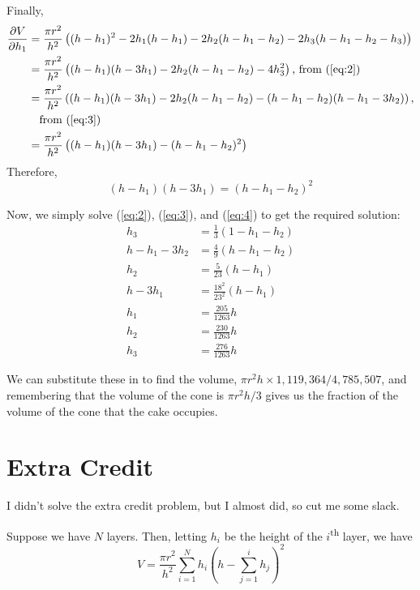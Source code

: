 \documentclass[12pt]{article}
\newcommand{\ts}[1]{\textsuperscript{#1}}
\begin{document}
Finally,
\begin{align*}
  \frac{\partial V}{\partial h_1} &= \frac{\pi r^2}{h^2}\left( (h - h_1)^2 - 2h_1(h-h_1) - 2h_2(h - h_1 - h_2) - 2h_3(h - h_1 - h_2 - h_3) \right)\\
                                  &= \frac{\pi r^2}{h^2} \left( (h-h_1)(h-3h_1) - 2h_2(h-h_1 - h_2) - 4h_3^2 \right)\text{, from (\ref{eq:2})} \\
                                  &= \frac{\pi r^2}{h^2} \left( (h-h_1)(h-3h_1) - 2h_2(h-h_1 - h_2) - (h-h_1-h_2)(h-h_1-3h_2) \right), \\
                                  &\quad \text{from (\ref{eq:3})}\\
  &= \frac{\pi r^2}{h^2}\left( (h-h_1)(h-3h_1) - (h-h_1 - h_2)^2 \right)
\end{align*}
Therefore,
\begin{equation}
  \label{eq:4}
  (h-h_1)(h-3h_1) = (h-h_1 - h_2)^2
\end{equation}

Now, we simply solve (\ref{eq:2}), (\ref{eq:3}), and (\ref{eq:4}) to get the required solution:
\begin{align*}
  h_3 &= \frac{1}{3}(1-h_1-h_2) \\
  h - h_1 - 3h_2 &= \frac{4}{9}(h-h_1-h_2) \\
  h_2 &= \frac{5}{23}(h-h_1)\\
  h - 3h_1 &= \frac{18^2}{23^2} (h-h_1) \\
  h_1 &= \frac{205}{1263}h \\
  h_2 &= \frac{230}{1263}h \\
  h_3 &= \frac{276}{1263}h
\end{align*}

We can substitute these in to find the volume, $\pi r^2 h \times 1,119,364/4,785,507$, and remembering that the volume of the cone is $\pi r^2 h / 3$ gives us the fraction of the volume of the cone that the cake occupies.

\section{Extra Credit}
\label{sec:extra-credit}

I didn't solve the extra credit problem, but I almost did, so cut me some slack.

Suppose we have $N$ layers. Then, letting $h_i$ be the height of the $i$\ts{th} layer, we have
\begin{equation*}
  V = \frac{\pi r^2}{h^2} \sum_{i=1}^N h_i \left( h - \sum_{j=1}^i h_j \right)^2
\end{equation*}
\end{document}
